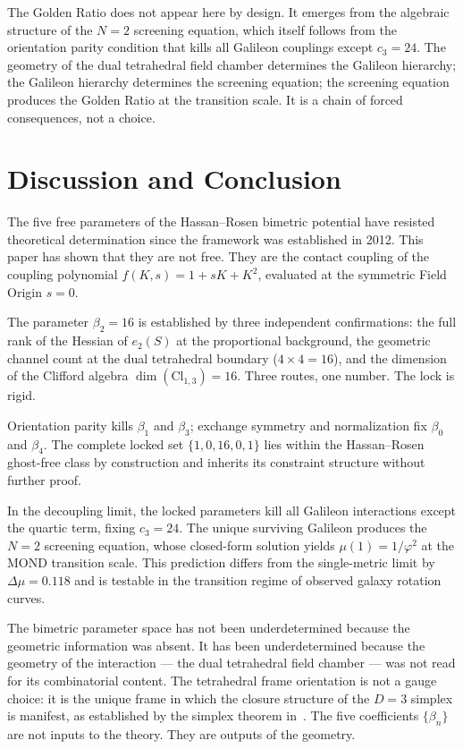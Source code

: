 \documentclass[a4paper,11pt]{article}
\begin{document}
The Golden Ratio does not appear here by design. It
emerges from the algebraic structure of the $N = 2$
screening equation, which itself follows from the
orientation parity condition that kills all Galileon
couplings except $c_3 = 24$. The geometry of the dual
tetrahedral field chamber determines the Galileon
hierarchy; the Galileon hierarchy determines the
screening equation; the screening equation produces
the Golden Ratio at the transition scale. It is a
chain of forced consequences, not a choice.

\section{Discussion and Conclusion}

The five free parameters of the Hassan--Rosen bimetric
potential have resisted theoretical determination since
the framework was established in 2012. This paper has
shown that they are not free. They are the contact coupling
of the coupling polynomial $f(K,s) = 1 + sK + K^2$,
evaluated at the symmetric Field Origin $s = 0$.

The parameter $\beta_2 = 16$ is established by three
independent confirmations: the full rank of the Hessian
of $e_2(S)$ at the proportional background, the geometric
channel count at the dual tetrahedral boundary
($4 \times 4 = 16$), and the dimension of the Clifford
algebra $\dim(\mathrm{Cl}_{1,3}) = 16$. Three routes,
one number. The lock is rigid.

Orientation parity kills $\beta_1$ and $\beta_3$;
exchange symmetry and normalization fix $\beta_0$ and
$\beta_4$. The complete locked set $\{1,0,16,0,1\}$
lies within the Hassan--Rosen ghost-free class by
construction and inherits its constraint structure
without further proof.

In the decoupling limit, the locked parameters kill
all Galileon interactions except the quartic term,
fixing $c_3 = 24$. The unique surviving Galileon
produces the $N = 2$ screening equation, whose
closed-form solution yields $\mu(1) = 1/\varphi^2$
at the MOND transition scale. This prediction differs
from the single-metric limit by $\Delta\mu = 0.118$ and
is testable in the transition regime of observed galaxy
rotation curves.

The bimetric parameter space has not been underdetermined
because the geometric information was absent. It has been
underdetermined because the geometry of the interaction
--- the dual tetrahedral field chamber --- was not
read for its combinatorial content. The tetrahedral frame
orientation is not a gauge choice: it is the unique frame
in which the closure structure of the $D = 3$ simplex is
manifest, as established by the simplex theorem
in~\cite{Nelson2026a}. The five coefficients
$\{\beta_n\}$ are not inputs to the theory. They are
outputs of the geometry.
\end{document}
